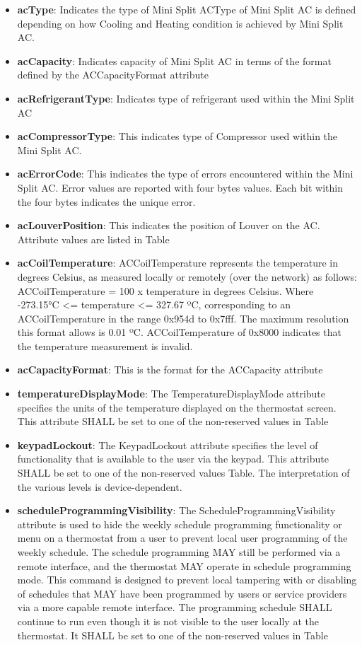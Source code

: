 \begin{itemize}
\item \textbf{acType}: Indicates the type of Mini Split ACType of Mini Split AC is defined depending on how Cooling and Heating condition is achieved by Mini Split AC.
\item \textbf{acCapacity}:  Indicates capacity of Mini Split AC in terms of the format defined by the ACCapacityFormat attribute
\item \textbf{acRefrigerantType}: Indicates type of refrigerant used within the Mini Split AC
\item \textbf{acCompressorType}: This indicates type of Compressor used within the Mini Split AC.
\item \textbf{acErrorCode}: This indicates the type of errors encountered within the Mini Split AC. Error values are reported with four bytes values. Each bit within the four bytes indicates the unique error.
\item \textbf{acLouverPosition}: This indicates the position of Louver on the AC. Attribute values are listed in Table
\item \textbf{acCoilTemperature}: ACCoilTemperature represents the temperature in degrees Celsius, as measured locally or remotely (over the network) as follows: ACCoilTemperature = 100 x temperature in degrees Celsius. Where -273.15°C <= temperature <= 327.67 ºC, corresponding to an ACCoilTemperature in the range 0x954d to 0x7fff. The maximum resolution this format allows is 0.01 ºC. ACCoilTemperature of 0x8000 indicates that the temperature measurement is invalid.
\item \textbf{acCapacityFormat}: This is the format for the ACCapacity attribute
\item \textbf{temperatureDisplayMode}: The TemperatureDisplayMode attribute specifies the units of the temperature displayed on the thermostat screen. This attribute SHALL be set to one of the non-reserved values in Table
\item \textbf{keypadLockout}: The KeypadLockout attribute specifies the level of functionality that is available to the user via the keypad. This attribute SHALL be set to one of the non-reserved values Table. The interpretation of the various levels is device-dependent.
\item \textbf{scheduleProgrammingVisibility}: The ScheduleProgrammingVisibility attribute is used to hide the weekly schedule programming functionality or menu on a thermostat from a user to prevent local user programming of the weekly schedule. The schedule programming MAY still be performed via a remote interface, and the thermostat MAY operate in schedule programming mode. This command is designed to prevent local tampering with or disabling of schedules that MAY have been programmed by users or service providers via a more capable remote interface. The programming schedule SHALL continue to run even though it is not visible to the user locally at the thermostat. It SHALL be set to one of the non-reserved values in Table
\end{itemize}

